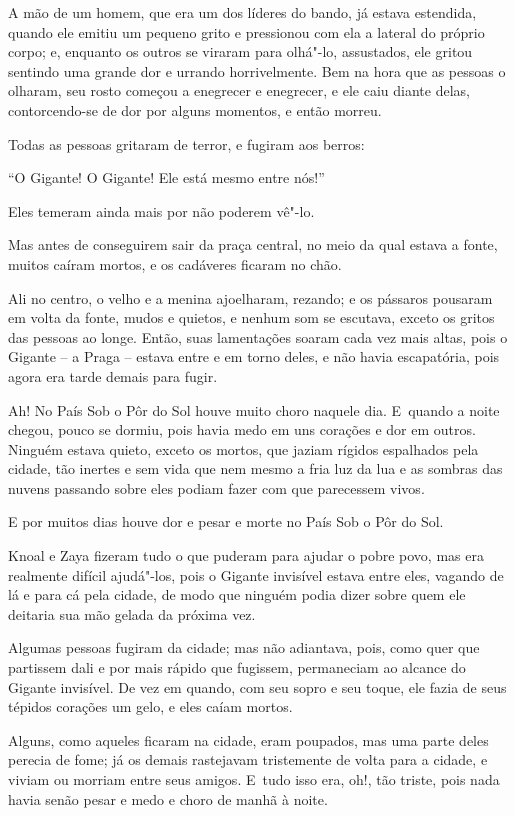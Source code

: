 A mão de um homem, que era um dos líderes do bando, já estava estendida,
quando ele emitiu um pequeno grito e pressionou com ela a lateral do
próprio corpo; e, enquanto os outros se viraram para olhá"-lo,
assustados, ele gritou sentindo uma grande dor e urrando horrivelmente.
Bem na hora que as pessoas o olharam, seu rosto começou a enegrecer e
enegrecer, e ele caiu diante delas, contorcendo-se de dor por alguns momentos, e
então morreu.

Todas as pessoas gritaram de terror, e fugiram aos berros:

``O Gigante! O Gigante! Ele está mesmo entre nós!''

Eles temeram ainda mais por não poderem vê"-lo.

Mas antes de conseguirem sair da praça central, no meio da qual
estava a fonte, muitos caíram mortos, e os cadáveres ficaram no chão.

Ali no centro, o velho e a menina ajoelharam, rezando; e os pássaros
pousaram em volta da fonte, mudos e quietos, e nenhum som se escutava,
exceto os gritos das pessoas ao longe. Então, suas lamentações soaram
cada vez mais altas, pois o Gigante -- a Praga -- estava entre e em
torno deles, e não havia escapatória, pois agora era tarde demais para
fugir.

Ah! No País Sob o Pôr do Sol houve muito choro naquele dia. E~quando a
noite chegou, pouco se dormiu, pois havia medo em uns corações e dor
em outros. Ninguém estava quieto, exceto os mortos, que jaziam rígidos
espalhados pela cidade, tão inertes e sem vida que nem mesmo a fria luz da lua e as
sombras das nuvens passando sobre eles podiam fazer com que parecessem
vivos.

E por muitos dias houve dor e pesar e morte no País Sob o Pôr do Sol.

Knoal e Zaya fizeram tudo o que puderam para ajudar o pobre povo, mas
era realmente difícil ajudá"-los, pois o Gigante invisível estava entre
eles, vagando de lá e para cá pela cidade, de modo que ninguém podia
dizer sobre quem ele deitaria sua mão gelada da próxima vez.

Algumas pessoas fugiram da cidade; mas não adiantava, pois, como quer
que partissem dali e por mais rápido que fugissem, permaneciam ao
alcance do Gigante invisível. De vez em quando, com seu sopro e seu
toque, ele fazia de seus tépidos corações um gelo, e eles caíam mortos.

Alguns, como aqueles ficaram na cidade, eram poupados, mas uma parte
deles perecia de fome; já os demais rastejavam tristemente de volta para
a cidade, e viviam ou morriam entre seus amigos. E~tudo isso era, oh!,
tão triste, pois nada havia senão pesar e medo e choro de manhã à noite.

